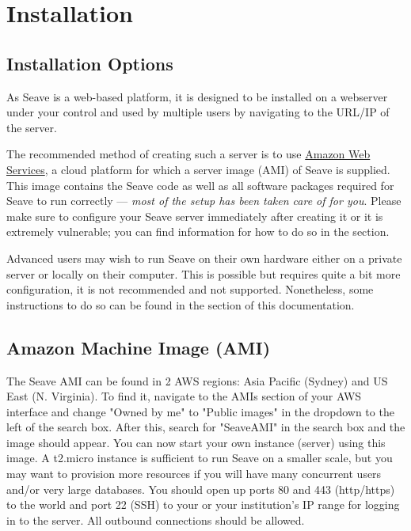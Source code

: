 \documentclass[11pt, a4paper]{article}
\begin{document}
\newpage

\section{Installation}

\subsection{Installation Options}

As Seave is a web-based platform, it is designed to be installed on a webserver under your control and used by multiple users by navigating to the URL/IP of the server.

The recommended method of creating such a server is to use \href{https://aws.amazon.com}{Amazon Web Services}, a cloud platform for which a server image (AMI) of Seave is supplied. This image contains the Seave code as well as all software packages required for Seave to run correctly --- \textit{most of the setup has been taken care of for you}. Please make sure to configure your Seave server immediately after creating it or it is extremely vulnerable; you can find information for how to do so in the  section.

Advanced users may wish to run Seave on their own hardware either on a private server or locally on their computer. This is possible but requires quite a bit more configuration, it is not recommended and not supported. Nonetheless, some instructions to do so can be found in the  section of this documentation.


\subsection{Amazon Machine Image (AMI)}

The Seave AMI can be found in 2 AWS regions: Asia Pacific (Sydney) and US East (N. Virginia). To find it, navigate to the AMIs section of your AWS interface and change "Owned by me" to "Public images" in the dropdown to the left of the search box. After this, search for "SeaveAMI" in the search box and the image should appear. You can now start your own instance (server) using this image. A t2.micro instance is sufficient to run Seave on a smaller scale, but you may want to provision more resources if you will have many concurrent users and/or very large databases. You should open up ports 80 and 443 (http/https) to the world and port 22 (SSH) to your or your institution's IP range for logging in to the server. All outbound connections should be allowed.
\end{document}
